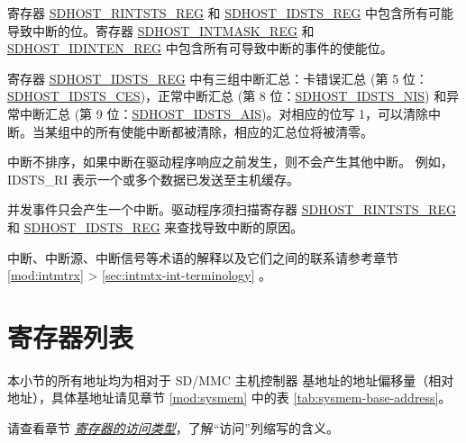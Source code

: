 \documentclass[main\_\_CN.tex]{subfiles}
\begin{document}
寄存器 \hyperref[regdesc:SDHOSTRINTSTSREG]{SDHOST\_RINTSTS\_REG} 和 \hyperref[regdesc:SDHOSTIDSTSREG]{SDHOST\_IDSTS\_REG} 中包含所有可能导致中断的位。寄存器 \hyperref[regdesc:SDHOSTINTMASKREG]{SDHOST\_INTMASK\_REG} 和 \hyperref[regdesc:SDHOSTIDINTENREG]{SDHOST\_IDINTEN\_REG} 中包含所有可导致中断的事件的使能位。

寄存器 \hyperref[regdesc:SDHOSTIDSTSREG]{SDHOST\_IDSTS\_REG} 中有三组中断汇总：卡错误汇总 (第 5 位：\hyperref[fielddesc:SDHOSTIDSTSCES]{SDHOST\_IDSTS\_CES})，正常中断汇总 (第 8 位：\hyperref[fielddesc:SDHOSTIDSTSNIS]{SDHOST\_IDSTS\_NIS}) 和异常中断汇总 (第 9 位：\hyperref[fielddesc:SDHOSTIDSTSAIS]{SDHOST\_IDSTS\_AIS})。对相应的位写 1，可以清除中断。当某组中的所有使能中断都被清除，相应的汇总位将被清零。

中断不排序，如果中断在驱动程序响应之前发生，则不会产生其他中断。 例如，IDSTS\_RI 表示一个或多个数据已发送至主机缓存。

并发事件只会产生一个中断。驱动程序须扫描寄存器 \hyperref[regdesc:SDHOSTRINTSTSREG]{SDHOST\_RINTSTS\_REG} 和 \hyperref[regdesc:SDHOSTIDSTSREG]{SDHOST\_IDSTS\_REG} 来查找导致中断的原因。

\begin{tiplisting}
中断、中断源、中断信号等术语的解释以及它们之间的联系请参考章节 \ref{mod:intmtrx} \textit{} > \ref{sec:intmtx-int-terminology} \textit{}。
\end{tiplisting}




\newpage
\hypertarget{sdhost-reg-summ}{}
\section{寄存器列表}
\label{sec:sdhost-reg-summ}

本小节的所有地址均为相对于 SD/MMC 主机控制器 基地址的地址偏移量（相对地址），具体基地址请见章节 \ref{mod:sysmem} \textit{} 中的表 \ref{tab:sysmem-base-address}。

请查看章节 \hyperref[glossary-access-types]{\textit{寄存器的访问类型}}，了解“访问”列缩写的含义。
\end{document}
